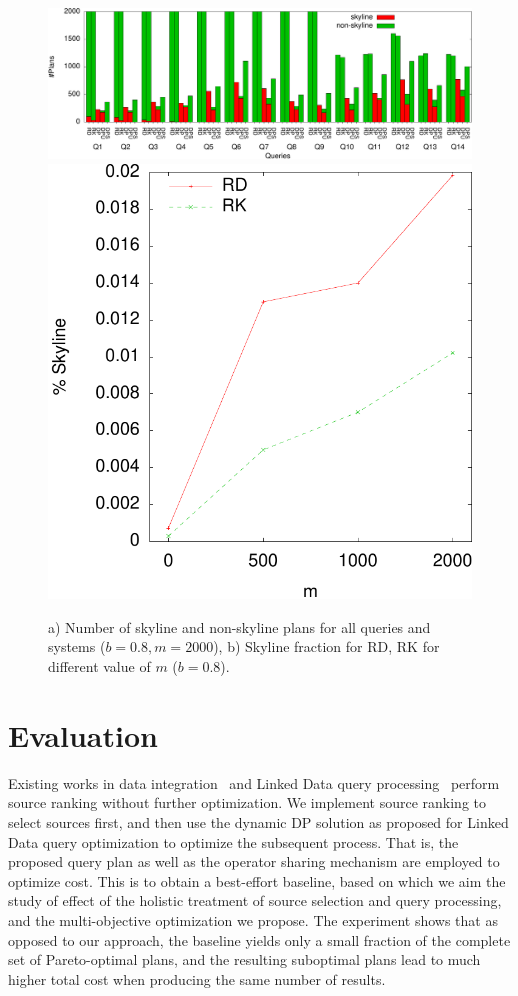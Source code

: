 \begin{figure}[htb]
  \vspace{-0.6cm}
  \centering
  \includegraphics[width=0.75\linewidth]{figs/all_queries-crop.pdf}
  \includegraphics[width=0.24\linewidth]{figs/plans_skyline_by_m-crop.pdf}
  \caption{a) Number of skyline and non-skyline plans for all queries
    and systems ($b=0.8, m=2000$), b) Skyline fraction for RD, RK for
    different value of $m$ ($b=0.8$).}
  \label{fig:queries}
  \vspace{-0.5cm}
\end{figure}
\vspace{-0.25cm}
\section{Evaluation}
\label{sec:eva}
Existing works in data integration~\cite{levy_querying_1996} and Linked Data query processing~\cite{harth_data_2010,ladwig_linked_2010} perform source ranking
without further optimization. We implement source ranking to select sources first, and then use the dynamic DP solution as proposed for Linked Data query optimization to optimize
the subsequent process. That is, the proposed query plan as well as
the operator sharing mechanism are employed to optimize cost. This is
to obtain a best-effort baseline, based on which we aim the study of
effect of the holistic treatment of source selection and query
processing, and the multi-objective optimization we propose. The
experiment shows that as opposed to our approach, the baseline yields
only a small fraction of the complete set of Pareto-optimal plans, and
the resulting suboptimal plans lead to much higher total cost when producing
the same number of results. 


